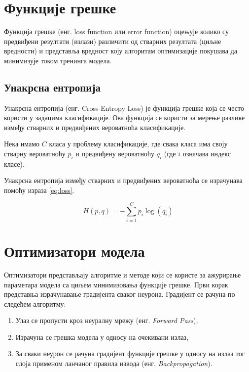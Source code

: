\documentclass[a4paper, 12pt, master, utf8]{etf}
\begin{document}
\section{Функције грешке}
\label{sec:25}

Функција грешке (енг. loss function или error function) оцењује колико су предвиђени резултати (излази) различити од стварних резултата (циљне вредности) и представља вредност коју алгоритам 
оптимизације покушава да минимизује током тренинга модела.

\subsection{Унакрсна ентропија}
\label{sec:261}

Унакрсна ентропија (енг. Cross-Entropy Loss) је функција грешке која се често користи у задацима класификације. 
Ова функција се користи за мерење разлике између стварних и предвиђених вероватноћа класификације.

Нека имамо $C$ класа у проблему класификације, где свака класа има своју стварну вероватноћу $p_i$ и предвиђену вероватноћу $q_i$ (где $i$ означава индекс класе).
\newline 

Унакрсна ентропија између стварних и предвиђених вероватноћа се израчунава помоћу израза \ref{eq:loss}.


\begin{equation}
    \label{eq:loss}
    H(p, q) = -\sum_{i=1}^{C} p_i \log(q_i)
\end{equation}
\section{Оптимизатори модела}
\label{sec:26}

Оптимизатори представљају алгоритме и методе који се користе за ажурирање параметара модела са циљем минимизовања функције грешке.
Први корак представња израчунавање градијента сваког неурона. Градијент се рачуна по следећем алгоритму:

\begin{enumerate}
    \item Улаз се пропусти кроз неуралну мрежу (енг. \textit{Forward Pass}),
    \item Израчуна се грешка модела у односу на очекивани излаз,
    \item За сваки неурон се рачуна градијент функције грешке у односу на излаз тог слоја применом ланчаног правила извода (енг. \textit{Backpropagation}).
\end{enumerate}
\end{document}
